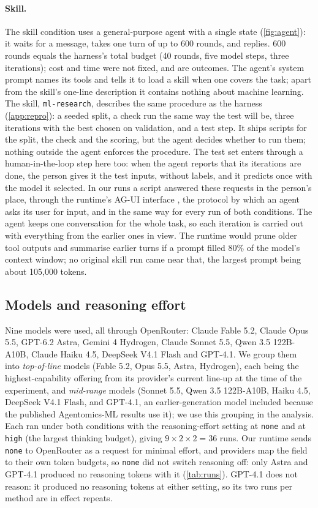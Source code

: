 \paragraph{Skill.} The skill condition uses a general-purpose agent with a single state (\cref{fig:agent}): it waits for
a message, takes one turn of up to 600 rounds, and replies. 600 rounds equals the harness's total budget (40 rounds,
five model steps, three iterations); cost and time were not fixed, and are outcomes. The agent's system prompt names its tools and tells it to load a skill when one
covers the task; apart from the skill's one-line description it contains nothing about machine learning. The skill, \texttt{ml-research}, describes the same
procedure as the harness (\cref{app:repro}): a seeded split, a check run the same way the test will be, three
iterations with the best chosen on validation, and a test step. It ships scripts for the split, the check and the
scoring, but the agent decides whether to run them; nothing outside the agent enforces the procedure. The test set
enters through a human-in-the-loop step here too: when the agent reports that its iterations are done, the person
gives it the test inputs, without labels, and it predicts once with the model it selected. In our runs a script
answered these requests in the person's place, through the runtime's AG-UI interface \citep{agui2025}, the protocol by which an agent asks its user for
input, and in the same way for every run of both conditions. The agent keeps one
conversation for the whole task, so each iteration is carried out with everything from the earlier ones in view.
The runtime would prune older tool outputs and summarise earlier turns if a prompt filled 80\% of the model's context
window; no original skill run came near that, the largest prompt being about 105,000 tokens.

\subsection{Models and reasoning effort}\label{sec:models}

Nine models were used, all through OpenRouter: Claude Fable 5.2, Claude Opus 5.5, GPT-6.2 Astra, Gemini 4 Hydrogen,
Claude Sonnet 5.5, Qwen 3.5 122B-A10B, Claude Haiku 4.5, DeepSeek V4.1 Flash and GPT-4.1. We group them into
\emph{top-of-line} models (Fable 5.2, Opus 5.5, Astra, Hydrogen), each being the highest-capability offering from its
provider's current line-up at the time of the experiment, and \emph{mid-range} models (Sonnet 5.5, Qwen 3.5 122B-A10B,
Haiku 4.5, DeepSeek V4.1 Flash, and GPT-4.1, an earlier-generation model included because the published Agentomics-ML
results use it); we use this grouping in the analysis. Each ran under both conditions with
the reasoning-effort setting at \texttt{none} and at \texttt{high} (the largest thinking budget), giving
$9 \times 2 \times 2 = 36$ runs. Our runtime sends \texttt{none} to OpenRouter as a request for minimal effort, and
providers map the field to their own token budgets, so \texttt{none} did not switch reasoning off: only Astra and
GPT-4.1 produced no reasoning tokens with it (\cref{tab:runs}). GPT-4.1 does
not reason: it produced no reasoning tokens at either setting, so its two runs per method are in effect repeats.

